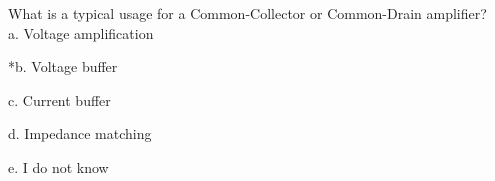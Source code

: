 
What is a typical usage for a Common-Collector or Common-Drain amplifier? \\

a. Voltage amplification

*b. Voltage buffer

c. Current buffer

d. Impedance matching

e. I do not know \\
